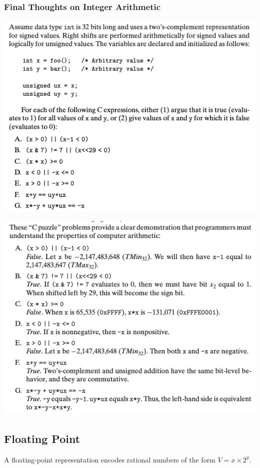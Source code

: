 \documentclass[11pt]{article}
\begin{document}
\subsubsection{Final Thoughts on Integer Arithmetic}
\label{sec:orgf467872}

\begin{center}
\includegraphics[width=.9\linewidth]{pics/c-puzzle-question.png}
\end{center}

\begin{center}
\includegraphics[width=.9\linewidth]{pics/c-puzzle-answer.png}
\end{center}


\subsection{Floating Point}
\label{sec:org31b18f8}
A floating-point representation encodes rational numbers of the form \(V = x \times 2^y\).\\
\end{document}
